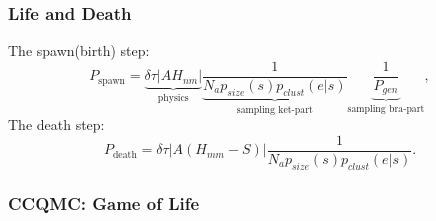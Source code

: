 \documentclass{beamer}
\begin{document}
\begin{frame}
\frametitle{Life and Death}
The spawn(birth) step:
\begin{equation*}
P_{\text{spawn}} = \underbrace{\delta \tau |A H_{nm}|}_{\text{physics}} \underbrace{\frac{1}{N_a p_{size}(s) p_{clust} (e|s)}}_{\text{sampling ket-part}} \underbrace{\frac{1}{P_{gen}}}_{\text{sampling bra-part}},
\end{equation*}
The death step:
\begin{equation*}
P_{\text{death}} = \delta \tau | A (H_{mm}-S) | \frac{1}{N_a p_{size}(s) p_{clust} (e|s)} .
\end{equation*}
\end{frame}

\begin{frame}
\frametitle{CCQMC: Game of Life}
\end{frame}
\end{document}
